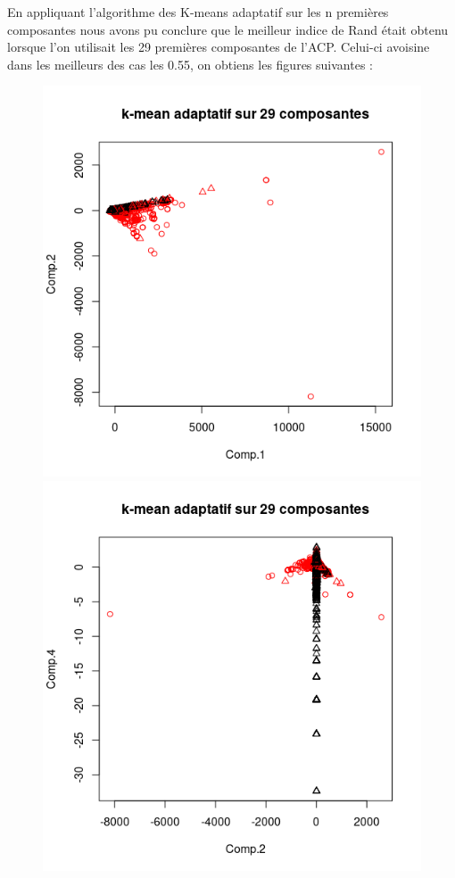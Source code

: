 \documentclass[a4paper, titlepage]{report}
\begin{document}
\begin{figure}[h]
\begin{center}
	\end{center}
\end{figure}

\pagebreak
En appliquant l'algorithme des K-means adaptatif sur les n premières composantes nous avons pu conclure que le meilleur indice de Rand était obtenu lorsque l'on utilisait les 29 premières composantes de l'ACP. Celui-ci avoisine dans les meilleurs des cas les 0.55, on obtiens les figures suivantes :


\begin{figure}[h]
	\begin{center}
		\includegraphics[scale = 0.40]{./doc/spam-comp-1-2.png}
		\includegraphics[scale = 0.40]{./doc/spam-comp-2-4.png}

\end{center}
\end{figure}
\end{document}
